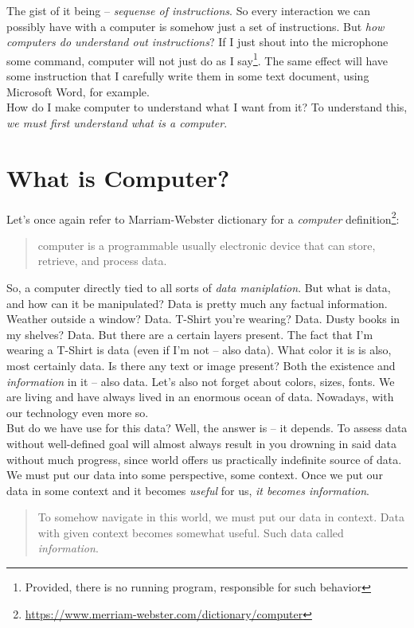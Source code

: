 \documentclass{article}
\begin{document}
        The gist of it being -- \emph{sequense of instructions}. So every interaction we can possibly have with a computer is somehow just a set of instructions. But \emph{how computers
        do understand out instructions}? If I just shout into the microphone some command, computer will not just do as I say\footnote{Provided, there is no running program, responsible for such behavior}.
        The same effect will have some instruction that I carefully write them in some text document, using Microsoft Word, for example.
        \\ 
        How do I make computer to understand what I want from it? To understand this, \emph{we must first understand what is a computer}.

    \section{What is Computer?}

        Let's once again refer to Marriam-Webster dictionary for a \emph{computer} definition\footnote{\href{https://www.merriam-webster.com/dictionary/computer}{https://www.merriam-webster.com/dictionary/computer}}:

        \begin{quote}
            computer is a programmable usually electronic device that can store, retrieve, and process data.
        \end{quote}

        So, a computer directly tied to all sorts of \emph{data maniplation}. But what is data, and how can it be manipulated? Data is pretty much any factual information.
        Weather outside a window? Data. T-Shirt you're wearing? Data. Dusty books in my shelves? Data. But there are a certain layers present. The fact that I'm wearing a T-Shirt 
        is data (even if I'm not -- also data). What color it is is also, most certainly data. Is there any text or image present?
        Both the existence and \emph{information} in it -- also data. Let's also not forget about colors, sizes, fonts. We are living and have always lived in an enormous ocean of data. Nowadays, with our technology even more so.
        \\
        But do we have use for this data? Well, the answer is -- it depends. To assess data without well-defined goal will almost always result in you drowning in said data without much progress,
        since world offers us practically indefinite source of data. We must put our data into some perspective, some context. Once we put our data in some context and it becomes \emph{useful} for us, \emph{it becomes information}.
        
        \begin{quote}
            To somehow navigate in this world, we must put our data in context. Data with given context becomes somewhat useful. Such data called \emph{information}.
        \end{quote}

        

    
\end{document}

